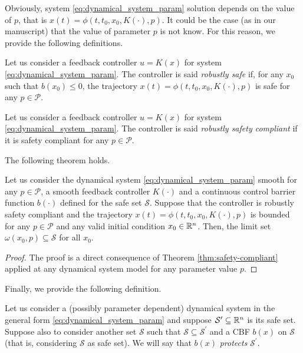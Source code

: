 Obviously, system \eqref{eq:dynamical_system_param} solution depends on the value of $p$, that is  $x(t)=\phi(t,t_0,x_0,K(\cdot),p)$.
It could be the case (as in our manuscript) that the value of parameter $p$ is not know. For this reason,
we provide the following definitions. 

\begin{definitionNoPoint}
	Let us consider a feedback controller $u=K(x)$ for system  \eqref{eq:dynamical_system_param}.
	The controller is said {\em robustly safe} if, for any $x_0$ such that $b(x_0)\leq 0$, the trajectory  $x(t)=\phi(t,t_0,x_0,K(\cdot),p)$ is safe for any $p\in \mathcal{P}$.
\end{definitionNoPoint}


\begin{definitionNoPoint}
	Let us consider a feedback controller $u=K(x)$ for system  \eqref{eq:dynamical_system_param}.
	The controller is said {\em robustly safety compliant} if it is safety compliant for any $p\in \mathcal{P}$.
\end{definitionNoPoint}


The following theorem holds.

\begin{theorem} \label{lemma:safety-enforcing-robust}
	Let us consider the dynamical system  \eqref{eq:dynamical_system_param} smooth for any $p\in\mathcal{P}$, a smooth feedback controller $K(\cdot)$ and a continuous control barrier function $b(\cdot)$ defined for the safe set $\mathcal{S}$. 
	Suppose that the controller is robustly safety compliant and the trajectory
	$x(t)=\phi(t,t_0,x_0,K(\cdot),p)$ is bounded for any $p\in\mathcal{P}$ and any valid initial condition $x_0\in\Bbb{R}^n$. Then, the limit set $\omega(x_0,p)\subseteq \mathcal{S}$ for all $x_0$.
	
	\begin{proof}
		The proof is a direct consequence of Theorem \ref{thm:safety-compliant} applied at any dynamical system model for any parameter value $p$.
	\end{proof}
\end{theorem}


Finally, we provide the following definition. 

\begin{definitionNoPoint}\label{def:protecting_barrier}
	Let us consider a (possibly parameter dependent) dynamical system in the general form \eqref{eq:dynamical_system_param} and suppose $\mathcal{S}^\prime\subseteq \Bbb{R}^n$ is its safe set. Suppose also to consider another set $\mathcal{S}$ such that $\mathcal{S}\subseteq \mathcal{S}^\prime$ and a CBF $b(x)$ on $\mathcal{S}$ (that is, considering $\mathcal{S}$ as safe set). We will say that $b(x)$ {\em protects} $\mathcal{S}^\prime$.
\end{definitionNoPoint}

